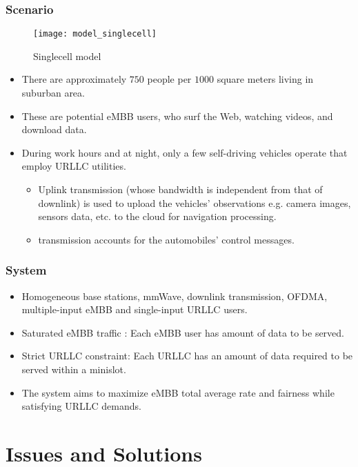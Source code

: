 \begin{frame}
  \frametitle{Scenario}
  \begin{figure}
    \texttt{[image: model\_singlecell]}
    \caption{Singlecell model}
  \end{figure}
\end{frame}

\begin{frame}
  \begin{itemize}
    \item There are approximately $750$ people per $1000$ square meters living in suburban area\exampleFootnote \cite{F19}.
    \item These are potential eMBB users, who surf the Web, watching videos, and download data.
    \item During work hours and at night, only a few self-driving vehicles operate that employ URLLC utilities.
      \begin{itemize}
        \item Uplink transmission (whose bandwidth is independent from that of downlink) is used to upload the vehicles' observations e.g. camera images, sensors data, etc. to the cloud for navigation processing.
        \item {} transmission accounts for the automobiles' control messages.
      \end{itemize}
  \end{itemize}
\end{frame}

\begin{frame}
  \frametitle{System}
  \begin{itemize}
    \item Homogeneous base stations, mmWave, downlink transmission, OFDMA, multiple-input eMBB and single-input URLLC users.
    \item Saturated eMBB traffic \cite{S05}: Each eMBB user has  amount of data to be served.
    \item Strict URLLC constraint: Each URLLC has an amount of data required to be served within a minislot.
    \item The system aims to maximize eMBB total average rate and fairness while satisfying URLLC demands.
  \end{itemize}
\end{frame}

\section{Issues and Solutions}
